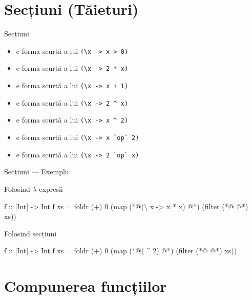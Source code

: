 \documentclass[handout,xcolor=pdftex,romanian,colorlinks]{beamer}
\begin{document}
\section{Secțiuni (Tăieturi)}

\begin{frame}[fragile]{Secțiuni}
\begin{itemize}
\item {} e forma scurtă a lui \lstinline$(\x -> x > 0)$
\item {} e forma scurtă a lui \lstinline$(\x -> 2 * x)$
\item {} e forma scurtă a lui \lstinline$(\x -> x + 1)$
\item {} e forma scurtă a lui \lstinline$(\x -> 2 ^ x)$
\item {} e forma scurtă a lui \lstinline$(\x -> x ^ 2)$
\item<2>  e forma scurtă a lui \lstinline$(\x -> x `op` 2)$
\item<2>  e forma scurtă a lui \lstinline$(\x -> 2 `op` x)$
\end{itemize}
\end{frame}


\begin{frame}[fragile]{Secțiuni --- Exemplu}
\begin{block}{Folosind $\lambda$-expresii}
\begin{asciihs}
f :: [Int] -> Int
f xs = foldr (+) 0 
         (map (*@\color{blue}(\textbackslash\; x -> x * x) @*) 
            (filter (*@\color{blue}{(\textbackslash\; x -> x > 0)} @*) xs))
\end{asciihs}
\end{block}

\begin{block}{Folosind secțiuni}
\begin{asciihs}
f :: [Int] -> Int
f xs = foldr (+) 0 (map (*@\color{blue}( \^{} 2) @*) (filter (*@\color{blue}{( > 0)} @*) xs))
\end{asciihs}
\end{block}
\end{frame}

\section{Compunerea funcțiilor}
\end{document}
